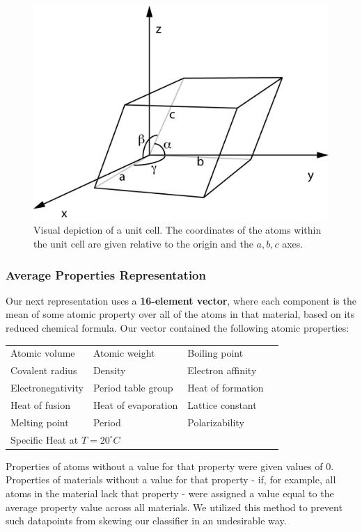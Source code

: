\documentclass[10pt,twocolumn,letterpaper]{article}
\begin{document}
\begin{figure}[ht]
\centering
\includegraphics[scale=0.5]{../images/UnitCell.png}
\caption{Visual depiction of a unit cell. The coordinates of the atoms within the unit cell are given relative to the origin and the $a,b,c$ axes.}
\label{fig:Unit-Cell}
\end{figure}

\subsubsection{Average Properties Representation}
Our next representation uses a \textbf{16-element vector}, where each component is the mean of some atomic property over all of the atoms in that material, based on its reduced chemical formula. Our vector contained the following atomic properties:
{\small
\begin{tabular}{llll}
    Atomic volume & Atomic weight & Boiling point \\
    Covalent radius & Density & Electron affinity \\ 
    Electronegativity & Period table group & Heat of formation \\
    Heat of fusion & Heat of evaporation & Lattice constant\\
    Melting point & Period & Polarizability\\
    \multicolumn{2}{l}{Specific Heat at $T=20^\circ C$}
\end{tabular}}
Properties of atoms without a value for that property were given values of 0. Properties of materials without a value for that property - if, for example, all atoms in the material lack that property - were assigned a value equal to the average property value across all materials. We utilized this method to prevent such datapoints from skewing our classifier in an undesirable way.
\end{document}
